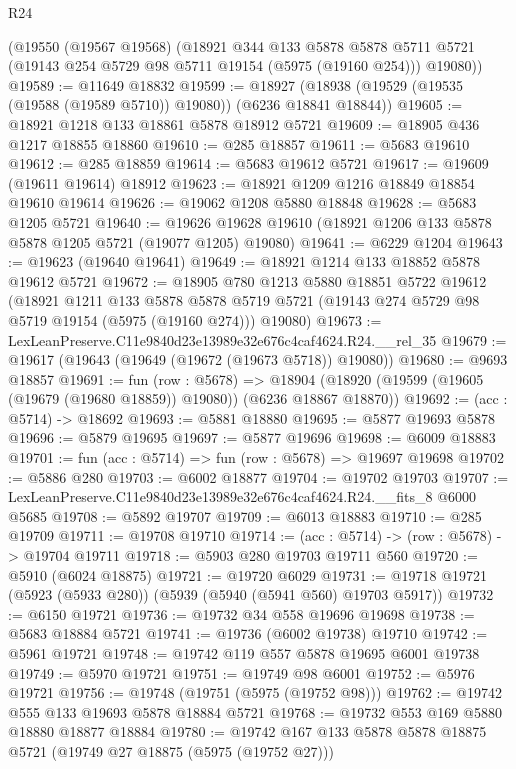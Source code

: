 \begin{lexlean}{R24}
\begin{coremodule}
    (@19550
      (@19567 @19568)
      (@18921
        @344
        @133
        @5878
        @5878
        @5711
        @5721
        (@19143 @254 @5729 @98 @5711 @19154 (@5975 (@19160 @254)))
        @19080))
@19589 := @11649 @18832
@19599 := @18927 (@18938 (@19529 (@19535 (@19588 (@19589 @5710)) @19080)) (@6236 @18841 @18844))
@19605 := @18921 @1218 @133 @18861 @5878 @18912 @5721
@19609 := @18905 @436 @1217 @18855 @18860
@19610 := @285 @18857
@19611 := @5683 @19610
@19612 := @285 @18859
@19614 := @5683 @19612 @5721
@19617 := @19609 (@19611 @19614) @18912
@19623 := @18921 @1209 @1216 @18849 @18854 @19610 @19614
@19626 := @19062 @1208 @5880 @18848
@19628 := @5683 @1205 @5721
@19640 := @19626 @19628 @19610 (@18921 @1206 @133 @5878 @5878 @1205 @5721 (@19077 @1205) @19080)
@19641 := @6229 @1204
@19643 := @19623 (@19640 @19641)
@19649 := @18921 @1214 @133 @18852 @5878 @19612 @5721
@19672 := @18905
    @780
    @1213
    @5880
    @18851
    @5722
    @19612
    (@18921
      @1211
      @133
      @5878
      @5878
      @5719
      @5721
      (@19143 @274 @5729 @98 @5719 @19154 (@5975 (@19160 @274)))
      @19080)
@19673 := LexLeanPreserve.C11e9840d23e13989e32e676c4caf4624.R24.__rel_35
@19679 := @19617 (@19643 (@19649 (@19672 (@19673 @5718)) @19080))
@19680 := @9693 @18857
@19691 := fun (row : @5678) =>
  @18904 (@18920 (@19599 (@19605 (@19679 (@19680 @18859)) @19080)) (@6236 @18867 @18870))
@19692 := (acc : @5714) -> @18692
@19693 := @5881 @18880
@19695 := @5877 @19693 @5878
@19696 := @5879 @19695
@19697 := @5877 @19696
@19698 := @6009 @18883
@19701 := fun (acc : @5714) => fun (row : @5678) => @19697 @19698
@19702 := @5886 @280
@19703 := @6002 @18877
@19704 := @19702 @19703
@19707 := LexLeanPreserve.C11e9840d23e13989e32e676c4caf4624.R24.__fits_8 @6000 @5685
@19708 := @5892 @19707
@19709 := @6013 @18883
@19710 := @285 @19709
@19711 := @19708 @19710
@19714 := (acc : @5714) -> (row : @5678) -> @19704 @19711
@19718 := @5903 @280 @19703 @19711 @560
@19720 := @5910 (@6024 @18875)
@19721 := @19720 @6029
@19731 := @19718 @19721 (@5923 (@5933 @280)) (@5939 (@5940 (@5941 @560) @19703 @5917))
@19732 := @6150 @19721
@19736 := @19732 @34 @558 @19696 @19698
@19738 := @5683 @18884 @5721
@19741 := @19736 (@6002 @19738) @19710
@19742 := @5961 @19721
@19748 := @19742 @119 @557 @5878 @19695 @6001 @19738
@19749 := @5970 @19721
@19751 := @19749 @98 @6001
@19752 := @5976 @19721
@19756 := @19748 (@19751 (@5975 (@19752 @98)))
@19762 := @19742 @555 @133 @19693 @5878 @18884 @5721
@19768 := @19732 @553 @169 @5880 @18880 @18877 @18884
@19780 := @19742 @167 @133 @5878 @5878 @18875 @5721 (@19749 @27 @18875 (@5975 (@19752 @27)))

\end{coremodule}
\end{lexlean}
